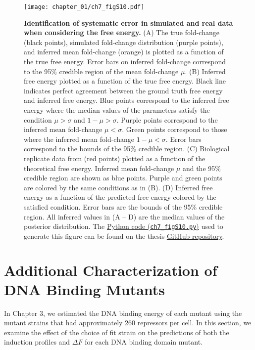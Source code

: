 \documentclass[12pt]{caltech_thesis}
\begin{document}
\hypertarget{fig:empirical_F_error}{%
\begin{figure}
\centering
\texttt{[image: chapter\_01/ch7\_figS10.pdf]}
\caption[{Identification of systematic error in simulated and real data
when considering the free energy.}]{\textbf{Identification of systematic
error in simulated and real data when considering the free energy.} (A)
The true fold-change (black points), simulated fold-change distribution
(purple points), and inferred mean fold-change (orange) is plotted as a
function of the true free energy. Error bars on inferred fold-change
correspond to the 95\% credible region of the mean fold-change \(\mu\).
(B) Inferred free energy plotted as a function of the true free energy.
Black line indicates perfect agreement between the ground truth free
energy and inferred free energy. Blue points correspond to the inferred
free energy where the median values of the parameters satisfy the
condition \(\mu > \sigma\) and \(1 - \mu > \sigma\). Purple points
correspond to the inferred mean fold-change \(\mu < \sigma\). Green
points correspond to those where the inferred mean fold-change
\(1 - \mu < \sigma\). Error bars correspond to the bounds of the 95\%
credible region. (C) Biological replicate data from
\textcite{razo-mejia2018} (red points) plotted as a function of the
theoretical free energy. Inferred mean fold-change \(\mu\) and the 95\%
credible region are shown as blue points. Purple and green points are
colored by the same conditions as in (B). (D) Inferred free energy as a
function of the predicted free energy colored by the satisfied
condition. Error bars are the bounds of the 95\% credible region. All
inferred values in (A -- D) are the median values of the posterior
distribution. The
\href{https://github.com/gchure/phd/blob/master/src/chapter_07/code/ch7_figS10.py}{Python
code (\texttt{ch7\_figS10.py})} used to generate this figure can be
found on the thesis \href{https://github.com/gchure/phd}{GitHub
repository}.}
\label{fig:empirical_F_error}
\end{figure}
}

\hypertarget{additional-characterization-of-dna-binding-mutants}{%
\section{Additional Characterization of DNA Binding
Mutants}\label{additional-characterization-of-dna-binding-mutants}}

In Chapter 3, we estimated the DNA binding energy of each mutant using
the mutant strains that had approximately 260 repressors per cell. In
this section, we examine the effect of the choice of fit strain on the
predictions of both the induction profiles and \(\Delta F\) for each DNA
binding domain mutant.
\end{document}
